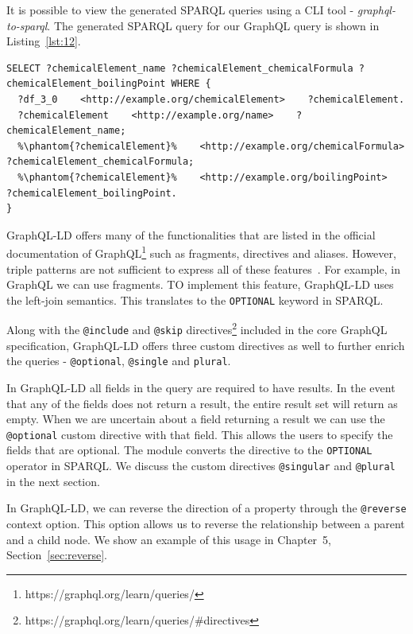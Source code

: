 It is possible to view the generated SPARQL queries using a CLI tool - \textit{graphql-to-sparql}. The generated SPARQL query for our GraphQL query is shown in Listing~\ref{lst:12}.

\begin{minipage}{\linewidth}
\begin{lstlisting}[label=lst:12, caption={Generated SPARQL query}, language=SPARQL, columns=fullflexible]
SELECT ?chemicalElement_name ?chemicalElement_chemicalFormula ?chemicalElement_boilingPoint WHERE {
  ?df_3_0    <http://example.org/chemicalElement>    ?chemicalElement.
  ?chemicalElement    <http://example.org/name>    ?chemicalElement_name;
  %\phantom{?chemicalElement}%    <http://example.org/chemicalFormula>	?chemicalElement_chemicalFormula;
  %\phantom{?chemicalElement}%    <http://example.org/boilingPoint>    ?chemicalElement_boilingPoint.
}
\end{lstlisting}
\end{minipage}

GraphQL-LD offers many of the functionalities that are listed in the official documentation of GraphQL\footnote{https://graphql.org/learn/queries/} such as fragments, directives and aliases. However, triple patterns are not sufficient to express all of these features~\cite{Taelman2018}. For example, in GraphQL we can use fragments. TO implement this feature, GraphQL-LD uses the left-join semantics. This translates to the \texttt{OPTIONAL} keyword in SPARQL.

Along with the \texttt{@include} and \texttt{@skip} directives\footnote{https://graphql.org/learn/queries/\#directives} included in the core GraphQL specification, GraphQL-LD offers three custom directives as well to further enrich the queries - \texttt{@optional}, \texttt{@single} and \texttt{plural}. 

In GraphQL-LD all fields in the query are required to have results. In the event that any of the fields does not return a result, the entire result set will return as empty. When we are uncertain about a field returning a result we can use the \texttt{@optional} custom directive with that field. This allows the users to specify the fields that are optional. The module converts the directive to the \texttt{OPTIONAL} operator in SPARQL. We discuss the custom directives \texttt{@singular} and \texttt{@plural} in the next section. 

In GraphQL-LD, we can reverse the direction of a property through the \texttt{@reverse} context option. This option allows us to reverse the relationship between a parent and a child node. We show an example of this usage in Chapter~5, Section~\ref{sec:reverse}.

